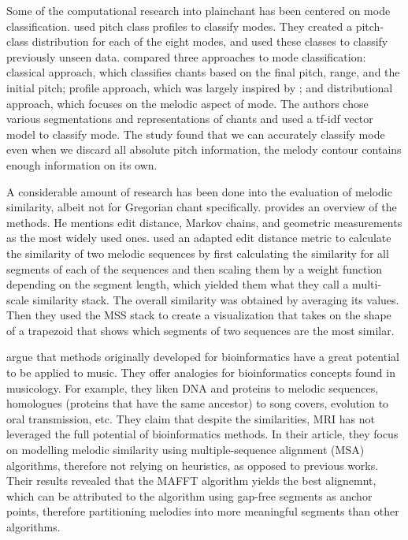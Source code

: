 Some of the computational research into plainchant has been centered on mode classification. \cite{mode_huron} used pitch class profiles to
classify modes. They created a pitch-class distribution for each of the eight modes, and used these classes to classify previously unseen data.
\cite{mode_cornelissen} compared three approaches to mode classification: classical approach, which classifies chants based on
the final pitch, range, and the initial pitch; profile approach, which was largely inspired by \cite{mode_huron}; and distributional approach,
which focuses on the melodic aspect of mode. The authors chose various segmentations and representations of chants and used a tf-idf vector
model to classify mode. The study found that we can accurately classify mode even when we discard all absolute pitch information, the melody
contour contains enough information on its own.

A considerable amount of research has been done into the evaluation of melodic similarity, albeit not for Gregorian chant specifically.
\cite{melodic_similarity} provides an overview of the methods. He mentions edit distance, Markov chains, and geometric measurements as
the most widely used ones. \cite{similarity_plot} used an adapted edit distance metric to calculate the similarity of two melodic sequences
by first calculating the similarity for all segments of each of the sequences and then scaling them by a weight function depending on the
segment length, which yielded them what they call a multi-scale similarity stack. The overall similarity was obtained by averaging its values.
Then they used the MSS stack to create a visualization that takes on the shape of a trapezoid that shows which segments of two sequences
are the most similar.

\cite{similarity_bioinf} argue that methods originally developed for bioinformatics have a great potential to be applied to music. They offer
analogies for bioinformatics concepts found in musicology. For example, they liken DNA and proteins to melodic sequences, homologues (proteins that
have the same ancestor) to song covers, evolution to oral transmission, etc. They claim that despite the similarities, MRI has not leveraged the
full potential of bioinformatics methods. In their article, they focus on modelling melodic similarity using multiple-sequence alignment (MSA)
algorithms, therefore not relying on heuristics, as opposed to previous works. Their results revealed that the MAFFT algorithm yields the best
alignemnt, which can be attributed to the algorithm using gap-free segments as anchor points, therefore partitioning melodies into more meaningful
segments than other algorithms.

